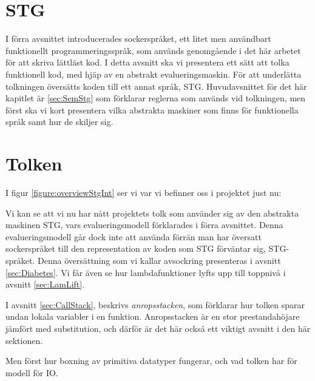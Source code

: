 \documentclass[Rapport]{subfiles}
\begin{document}
\chapter{STG}
\label{sec:Core}
\label{sec:STG}

\overviewStg

I förra avsnittet introducerades sockerspråket, ett litet men användbart
funktionellt programmeringsspråk, som används genomgående i det här
arbetet för att skriva lättläst kod.
    I detta avsnitt ska vi presentera ett sätt att tolka funktionell kod, med hjäp av  
en abstrakt evalueringsmaskin. För att underlätta
tolkningen översätts koden till ett annat språk, STG. 
Huvudavsnittet för det här kapitlet är \ref{sec:SemStg} %
som förklarar reglerna som används vid tolkningen, men först ska vi kort presentera
vilka abstrakta maskiner som finns för funktionella språk samt hur de skiljer sig.






\chapter{Tolken}
\label{sec:Tolken}

I figur \ref{figure:overviewStgInt} ser vi var vi befinner oss i projektet just nu:

\overviewStgInt

Vi kan se att vi nu har nått projektets tolk som använder sig av den abstrakta maskinen STG, vars
evalueringsmodell förklarades i förra avsnittet. Denna evalueringsmodell går
dock inte att använda förrän man har översatt
sockerspråket till den representation av koden som STG förväntar sig, STG-språket.
Denna översättning som vi kallar avsockring presenteras i avsnitt \ref{sec:Diabetes}.
Vi får även se hur lambdafunktioner lyfts upp till toppnivå i avsnitt \ref{sec:LamLift}.

I avsnitt \ref{sec:CallStack}, beskrivs \emph{anropsstacken}, som förklarar hur tolken
sparar undan lokala variabler i en funktion. Anropsstacken är en 
stor prestandahöjare jämfört med substitution, och därför är det här också ett
viktigt avsnitt i den här sektionen.

Men först hur boxning av primitiva datatyper fungerar, och vad tolken har
för modell för IO.






\end{document}
